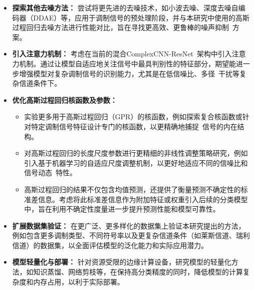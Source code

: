 \documentclass{article}
\begin{document}
\begin{itemize}
    \item \textbf{探索其他去噪方法：} 尝试将更先进的去噪技术，如小波去噪、深度去噪自编码器（DDAE）等，应用于调制信号的预处理阶段，并与本研究中使用的高斯过程回归去噪方法进行性能对比，旨在寻找更高效、更鲁棒的噪声抑制~方案。
    \item \textbf{引入注意力机制：} 考虑在当前的混合ComplexCNN-ResNet~架构中引入注意力机制。通过让模型自适应地关注信号中最具判别性的特征部分，期望能进一步增强模型对复杂调制信号的识别能力，尤其是在低信噪比、多径~干扰等复杂信道条件下。
    \item \textbf{优化高斯过程回归核函数及参数：}
    \begin{itemize}
        \item 实验更多用于高斯过程回归（GPR）的核函数，例如探索复合核函数或针对特定调制信号特征设计专门的核函数，以更精确地捕捉~信号的内在结构。
        \item 对高斯过程回归的长度尺度参数进行更精细的非线性调整策略研究，例如引入基于机器学习的自适应尺度调整机制，以更好地适应不同的信噪比和信号动态~特性。
        \item 高斯过程回归的结果不仅包含均值预测，还提供了衡量预测不确定性的标准差信息。考虑将此标准差信息作为附加特征或权重引入后续的分类模型中，旨在利用不确定性度量进一步提升预测性能和模型可靠性。
    \end{itemize}
    \item \textbf{扩展数据集验证：} 在更广泛、更多样化的数据集上验证本研究提出的方法，例如包含更多调制类型、不同符号率以及更复杂信道条件（如莱斯信道、瑞利信道）的数据集，以全面评估模型的泛化能力和实际应用潜力。
    \item \textbf{模型轻量化与部署：} 针对资源受限的边缘计算设备，研究模型的轻量化方法，如知识蒸馏、网络剪枝等，在保持高分类精度的同时，降低模型的计算复杂度和内存占用，以利于实际部署。
\end{itemize}

\printbibliography
\end{document}
